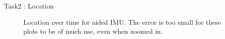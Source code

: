 \documentclass[10pt]{beamer}
\theoremstyle{definition}
\begin{document}
\begin{frame}{Task2 : Location}
\begin{figure}

    \caption{Location over time for aided IMU.  The error is too small for these plots to be of much use, even when zoomed in.}
    
\end{figure}
\begin{figure}
    
\end{figure}

\end{frame}
\end{document}
